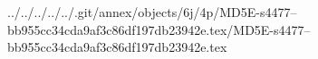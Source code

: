 ../../../../../.git/annex/objects/6j/4p/MD5E-s4477--bb955cc34cda9af3c86df197db23942e.tex/MD5E-s4477--bb955cc34cda9af3c86df197db23942e.tex